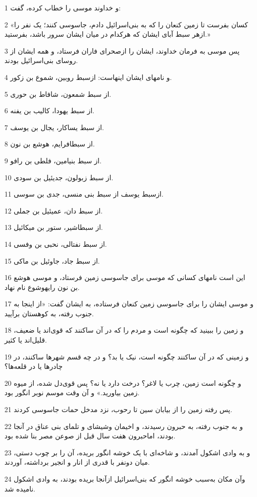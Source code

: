 \par 1 و خداوند موسی را خطاب کرده، گفت:
\par 2 «کسان بفرست تا زمین کنعان را که به بنی‌اسرائیل دادم، جاسوسی کنند؛ یک نفر را ازهر سبط آبای ایشان که هرکدام در میان ایشان سرور باشد، بفرستید.»
\par 3 پس موسی به فرمان خداوند، ایشان را ازصحرای فاران فرستاد، و همه ایشان از روسای بنی‌اسرائیل بودند.
\par 4 و نامهای ایشان اینهاست: ازسبط روبین، شموع بن زکور.
\par 5 از سبط شمعون، شافاط بن حوری.
\par 6 از سبط یهودا، کالیب بن یفنه.
\par 7 از سبط یساکار، یجال بن یوسف.
\par 8 از سبطافرایم، هوشع بن نون.
\par 9 از سبط بنیامین، فلطی بن رافو.
\par 10 از سبط زبولون، جدیئیل بن سودی.
\par 11 ازسبط یوسف از سبط بنی منسی، جدی بن سوسی.
\par 12 از سبط دان، عمیئیل بن جملی.
\par 13 از سبطاشیر، ستور بن میکائیل. 
\par 14 از سبط نفتالی، نحبی بن وفسی.
\par 15 از سبط جاد، جاوئیل بن ماکی.
\par 16 این است نامهای کسانی که موسی برای جاسوسی زمین فرستاد، و موسی هوشع بن نون رایهوشوع نام نهاد.
\par 17 و موسی ایشان را برای جاسوسی زمین کنعان فرستاده، به ایشان گفت: «از اینجا به جنوب رفته، به کوهستان برآیید.
\par 18 و زمین را ببینید که چگونه است و مردم را که در آن ساکنند که قوی‌اند یا ضعیف، قلیل‌اند یا کثیر.
\par 19 و زمینی که در آن ساکنند چگونه است، نیک یا بد؟ و در چه قسم شهرها ساکنند، در چادرها یا در قلعه‌ها؟
\par 20 و چگونه است زمین، چرب یا لاغر؟ درخت دارد یا نه؟ پس قوی‌دل شده، از میوه زمین بیاورید.» و آن وقت موسم نوبر انگور بود.
\par 21 پس رفته زمین را از بیابان سین تا رحوب، نزد مدخل حمات جاسوسی کردند.
\par 22 و به جنوب رفته، به حبرون رسیدند، و اخیمان وشیشای و تلمای بنی عناق در آنجا بودند، اماحبرون هفت سال قبل از صوعن مصر بنا شده بود.
\par 23 و به وادی اشکول آمدند، و شاخه‌ای با یک خوشه انگور بریده، آن را بر چوب دستی، میان دونفر با قدری از انار و انجیر برداشته، آوردند.
\par 24 وآن مکان به‌سبب خوشه انگور که بنی‌اسرائیل ازآنجا بریده بودند، به وادی اشکول نامیده شد.
